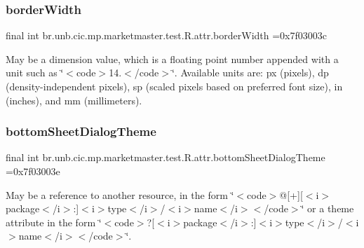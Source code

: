 \subsubsection{\texorpdfstring{border\+Width}{borderWidth}}
{\footnotesize\ttfamily final int br.\+unb.\+cic.\+mp.\+marketmaster.\+test.\+R.\+attr.\+border\+Width =0x7f03003c\hspace{0.3cm}{\ttfamily [static]}}

May be a dimension value, which is a floating point number appended with a unit such as \char`\"{}$<$code$>$14.\+5sp$<$/code$>$\char`\"{}. Available units are\+: px (pixels), dp (density-\/independent pixels), sp (scaled pixels based on preferred font size), in (inches), and mm (millimeters). \mbox{\label{classbr_1_1unb_1_1cic_1_1mp_1_1marketmaster_1_1test_1_1R_1_1attr_abf230fe21e231e6135f3995dde267bd2}} 
\subsubsection{\texorpdfstring{bottom\+Sheet\+Dialog\+Theme}{bottomSheetDialogTheme}}
{\footnotesize\ttfamily final int br.\+unb.\+cic.\+mp.\+marketmaster.\+test.\+R.\+attr.\+bottom\+Sheet\+Dialog\+Theme =0x7f03003e\hspace{0.3cm}{\ttfamily [static]}}

May be a reference to another resource, in the form \char`\"{}$<$code$>$@\mbox{[}+\mbox{]}\mbox{[}$<$i$>$package$<$/i$>$\+:\mbox{]}$<$i$>$type$<$/i$>$/$<$i$>$name$<$/i$>$$<$/code$>$\char`\"{} or a theme attribute in the form \char`\"{}$<$code$>$?\mbox{[}$<$i$>$package$<$/i$>$\+:\mbox{]}$<$i$>$type$<$/i$>$/$<$i$>$name$<$/i$>$$<$/code$>$\char`\"{}. \mbox{\label{classbr_1_1unb_1_1cic_1_1mp_1_1marketmaster_1_1test_1_1R_1_1attr_a5b4f8143998c6458d022008a59ba70f1}} 
